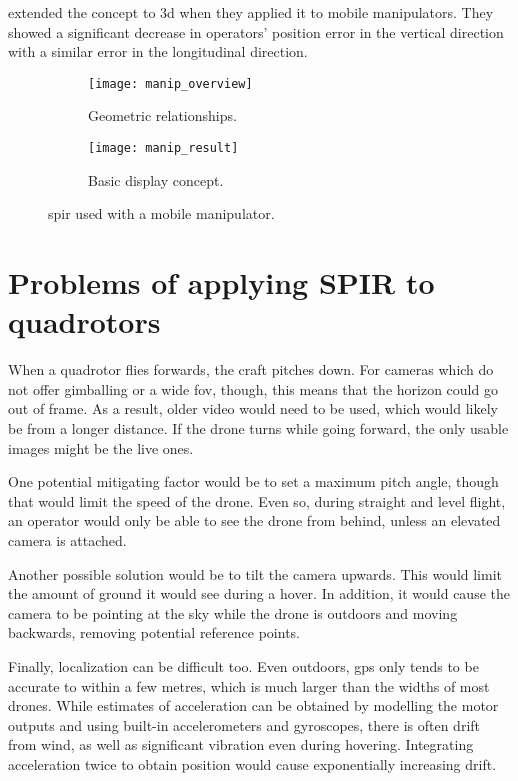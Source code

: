     \textcite{murata2014} extended the concept to \gls{3d} when they applied it to mobile manipulators.
    They showed a significant decrease in operators' position error in the vertical direction with a similar error in the longitudinal direction.

    \begin{figure}[h]
      \centering
      \begin{subfigure}[b]{0.45\textwidth}
	\texttt{[image: manip\_overview]}
	\caption{Geometric relationships.}
	\label{fig:manip_overview_background}
      \end{subfigure}
      \hfill
      \begin{subfigure}[b]{0.45\textwidth}
	\texttt{[image: manip\_result]}
	\caption{Basic display concept.}
      \end{subfigure}
      \caption[\acrshort{spir} with mobile manipulator]{\gls{spir} used with a mobile manipulator.\cite{murata2014}}
      \label{fig:manip_results}
    \end{figure}

\section{Problems of applying SPIR to quadrotors}
  When a quadrotor flies forwards, the craft pitches down.
  For cameras which do not offer gimballing or a wide \gls{fov}, though, this means that the horizon could go out of frame.
  As a result, older video would need to be used, which would likely be from a longer distance.
  If the drone turns while going forward, the only usable images might be the live ones.

  One potential mitigating factor would be to set a maximum pitch angle, though that would limit the speed of the drone.
  Even so, during straight and level flight, an operator would only be able to see the drone from behind, unless an elevated camera is attached.

  Another possible solution would be to tilt the camera upwards.
  This would limit the amount of ground it would see during a hover.
  In addition, it would cause the camera to be pointing at the sky while the drone is outdoors and moving backwards, removing potential reference points.

  Finally, localization can be difficult too.
  Even outdoors, \gls{gps} only tends to be accurate to within a few metres, which is much larger than the widths of most drones.
  While estimates of acceleration can be obtained by modelling the motor outputs and using built-in accelerometers and gyroscopes, there is often drift from wind, as well as significant vibration even during hovering.
  Integrating acceleration twice to obtain position would cause exponentially increasing drift.

